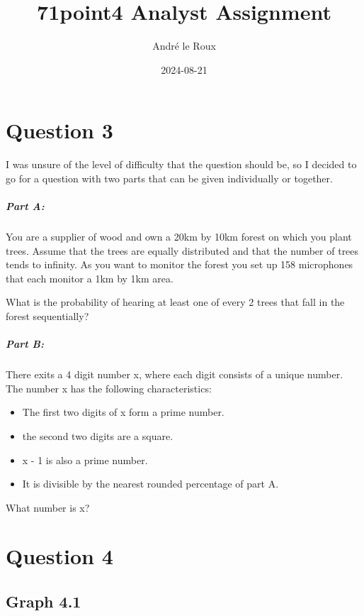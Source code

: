 \documentclass[
  11pt,
]{article}
\title{71point4 Analyst Assignment}
\author{André le Roux}
\date{2024-08-21}
\providecommand{\tightlist}{%
  \setlength{\itemsep}{0pt}\setlength{\parskip}{0pt}}
\begin{document}
\maketitle

\hypertarget{question-3}{%
\section{Question 3}\label{question-3}}

I was unsure of the level of difficulty that the question should be, so
I decided to go for a question with two parts that can be given
individually or together.

\hypertarget{part-a}{%
\subparagraph{Part A:}\label{part-a}}

You are a supplier of wood and own a 20km by 10km forest on which you
plant trees. Assume that the trees are equally distributed and that the
number of trees tends to infinity. As you want to monitor the forest you
set up 158 microphones that each monitor a 1km by 1km area.

What is the probability of hearing at least one of every 2 trees that
fall in the forest sequentially?

\hypertarget{part-b}{%
\subparagraph{Part B:}\label{part-b}}

There exits a 4 digit number x, where each digit consists of a unique
number. The number x has the following characteristics:

\begin{itemize}
\tightlist
\item
  The first two digits of x form a prime number.
\item
  the second two digits are a square.
\item
  x - 1 is also a prime number.
\item
  It is divisible by the nearest rounded percentage of part A.
\end{itemize}

What number is x?

\hypertarget{question-4}{%
\section{Question 4}\label{question-4}}

\hypertarget{graph-4.1}{%
\subsection{Graph 4.1}\label{graph-4.1}}
\end{document}
